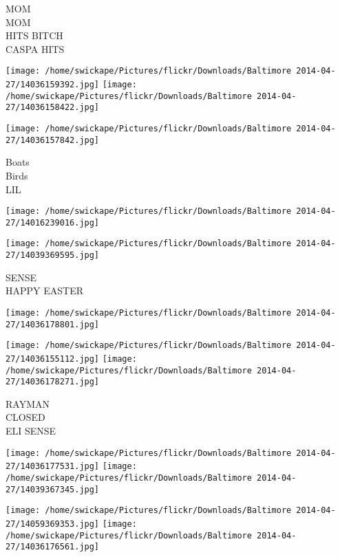 \documentclass[10pt,letterpaper]{article}
\begin{document}
MOM\\
MOM\\
HITS BITCH\\
CASPA HITS\\
\pagebreak

\texttt{[image: /home/swickape/Pictures/flickr/Downloads/Baltimore 2014-04-27/14036159392.jpg]}
\texttt{[image: /home/swickape/Pictures/flickr/Downloads/Baltimore 2014-04-27/14036158422.jpg]}

\vspace{0.25in}
\texttt{[image: /home/swickape/Pictures/flickr/Downloads/Baltimore 2014-04-27/14036157842.jpg]}

Boats\\
Birds\\
LIL\\
\pagebreak

\texttt{[image: /home/swickape/Pictures/flickr/Downloads/Baltimore 2014-04-27/14016239016.jpg]}

\vspace{0.25in}
\texttt{[image: /home/swickape/Pictures/flickr/Downloads/Baltimore 2014-04-27/14039369595.jpg]}

SENSE\\
HAPPY EASTER\\
\pagebreak

\texttt{[image: /home/swickape/Pictures/flickr/Downloads/Baltimore 2014-04-27/14036178801.jpg]}

\vspace{0.25in}
\texttt{[image: /home/swickape/Pictures/flickr/Downloads/Baltimore 2014-04-27/14036155112.jpg]}
\texttt{[image: /home/swickape/Pictures/flickr/Downloads/Baltimore 2014-04-27/14036178271.jpg]}

RAYMAN\\
CLOSED\\
ELI SENSE\\
\pagebreak

\texttt{[image: /home/swickape/Pictures/flickr/Downloads/Baltimore 2014-04-27/14036177531.jpg]}
\texttt{[image: /home/swickape/Pictures/flickr/Downloads/Baltimore 2014-04-27/14039367345.jpg]}

\texttt{[image: /home/swickape/Pictures/flickr/Downloads/Baltimore 2014-04-27/14059369353.jpg]}
\texttt{[image: /home/swickape/Pictures/flickr/Downloads/Baltimore 2014-04-27/14036176561.jpg]}
\end{document}
